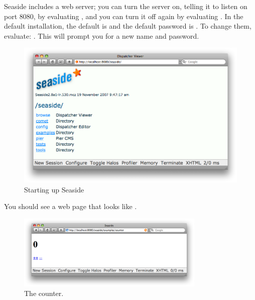 \documentclass[a4paper,10pt,twoside]{book}
\begin{document}
Seaside includes a web server; you can turn the server on, telling it to listen on port 8080, by evaluating  ,
and you can turn it off again by evaluating .
In the default installation, the default  is  and the default password is .
To change them, evaluate:  .
This will prompt you for a new name and password.

\begin{figure}[tbh]
\begin{center}
\includegraphics[width=\textwidth]{seasideStartup}
\caption{Starting up Seaside
}
\label{fig:seasideStartup}
\end{center}
\end{figure}


\noindent
You should see a web page that looks like .

\noindent
{}

\begin{figure}[htb]
\begin{center}
\includegraphics[width=0.8\textwidth]{counter}
\caption{The counter.}
\label{fig:counter}
\end{center}
\end{figure}
\end{document}
